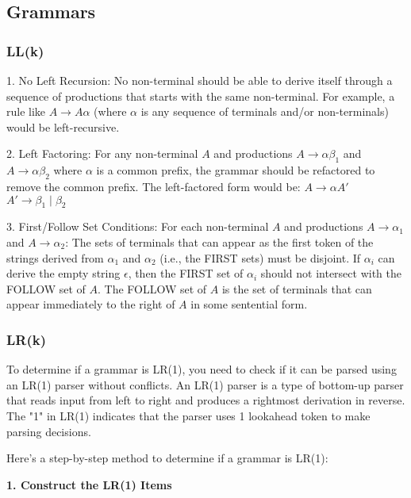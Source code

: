 \subsection{Grammars}

\subsubsection{LL(k)}

1. No Left Recursion: No non-terminal should be able to derive itself through a sequence of productions that starts with the same non-terminal. For example, a rule like $A \rightarrow A\alpha$ (where $\alpha$  is any sequence of terminals and/or non-terminals) would be left-recursive.

2. Left Factoring: For any non-terminal $A$ and productions $A \rightarrow \alpha \beta_1$ and $A \rightarrow \alpha \beta_2$ where $\alpha$ is a common prefix, the grammar should be refactored to remove the common prefix. The left-factored form would be:
   $A \rightarrow \alpha A'$\\
   $A' \rightarrow \beta_1 \mid \beta_2$

3. First/Follow Set Conditions: For each non-terminal $A$ and productions $A \rightarrow \alpha_1$ and $A \rightarrow \alpha_2$:
   The sets of terminals that can appear as the first token of the strings derived from $\alpha_1$ and $\alpha_2$ (i.e., the FIRST sets) must be disjoint.
   If $\alpha_i$ can derive the empty string $\epsilon$, then the FIRST set of $\alpha_i$ should not intersect with the FOLLOW set of $A$. The FOLLOW set of $A$ is the set of terminals that can appear immediately to the right of $A$ in some sentential form.





\subsubsection{LR(k)}
To determine if a grammar is LR(1), you need to check if it can be parsed using an LR(1) parser without conflicts. An LR(1) parser is a type of bottom-up parser that reads input from left to right and produces a rightmost derivation in reverse. The "1" in LR(1) indicates that the parser uses 1 lookahead token to make parsing decisions.

Here's a step-by-step method to determine if a grammar is LR(1):

\textbf{1. Construct the LR(1) Items}\\

